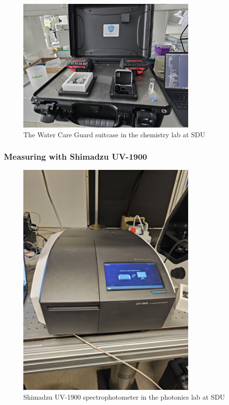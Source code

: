 \documentclass{article}
\begin{document}
\begin{figure}[H]
    \centering
    \includegraphics[width=0.8\textwidth]{wcg_suitcase.jpg}
    \caption{The Water Care Guard suitcase in the chemistry lab at SDU}
    \label{fig:wcg_suitcase}
\end{figure}

\subsubsection{Measuring with Shimadzu UV-1900}

\begin{figure}[H]
    \centering
    \includegraphics[width=0.8\textwidth, angle=270]{shimadzu_uv1900.jpg}
    \caption{Shimadzu UV-1900 spectrophotometer in the photonics lab at SDU}
    \label{fig:shimadzuuv1900}
\end{figure}
\end{document}
